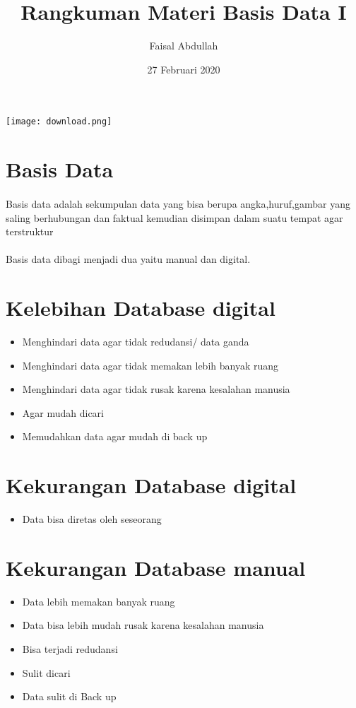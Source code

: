\documentclass[10pt]{article}
\title{Rangkuman Materi Basis Data I}
\author{Faisal Abdullah }
\date{27 Februari 2020  }
\begin{document}
\maketitle
\begin{center}
    \texttt{[image: download.png]}
\end{center}

\newpage

\section*{Basis Data}
\paragraph{}Basis data adalah sekumpulan data yang bisa berupa angka,huruf,gambar yang saling berhubungan dan faktual kemudian disimpan dalam suatu tempat agar terstruktur 
\paragraph{}Basis data dibagi menjadi dua yaitu manual dan digital.

\section*{Kelebihan Database digital}
\begin{itemize}
  \item Menghindari data agar tidak redudansi/ data ganda
  \item Menghindari data agar tidak memakan lebih banyak ruang
  \item Menghindari data agar tidak rusak karena kesalahan manusia
  \item Agar mudah dicari
  \item Memudahkan data agar mudah di back up
 \end{itemize}
 
  \section*{Kekurangan Database digital}
\begin{itemize}
  \item Data bisa diretas oleh seseorang
 \end{itemize}

 
 \section*{Kekurangan Database manual}
\begin{itemize}
  \item Data lebih memakan banyak ruang
  \item Data bisa lebih mudah rusak karena kesalahan manusia
  \item Bisa terjadi redudansi
  \item Sulit dicari
  \item Data sulit di Back up
 \end{itemize}
 
\end{document}
